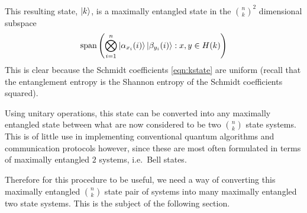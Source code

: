 This resulting state, $\ket{k}$,  is a maximally entangled state in the $\binom{n}{k}^2$ dimensional subspace 
$$\text{span}\left(\bigotimes_{i=1}^n 
\ket{\alpha_{x_i}(i)} \ket{\beta_{y_i}(i)}: x,y \in H(k)\right)
$$
This is clear because the Schmidt coefficients \eqref{eqn:kstate} are uniform (recall that the entanglement entropy is the Shannon entropy of the Schmidt coefficients squared).

Using unitary operations, this state can be converted into any maximally entangled state between what are now considered to be two $\binom{n}{k}$ state systems.
This is of little use in implementing conventional quantum algorithms and communication protocols however, since these are most often formulated in terms of maximally entangled $2$ systems, i.e.\ Bell states.

Therefore for this procedure to be useful, we need a way of converting this maximally entangled $\binom{n}{k}$ state pair of systems into many maximally entangled two state systems. This is the subject of the following section.
